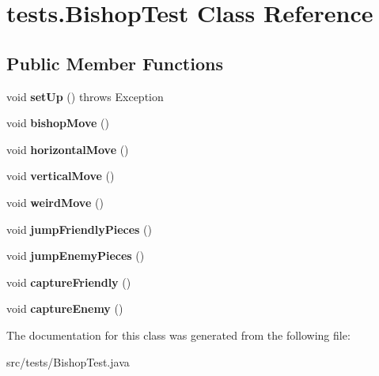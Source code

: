 \hypertarget{classtests_1_1_bishop_test}{\section{tests.\-Bishop\-Test Class Reference}
\label{classtests_1_1_bishop_test}
}
\subsection*{Public Member Functions}
\begin{DoxyCompactItemize}
\item 
\hypertarget{classtests_1_1_bishop_test_adeff634258715bf610ef1f657b0866f5}{void {\bfseries set\-Up} ()  throws Exception }\label{classtests_1_1_bishop_test_adeff634258715bf610ef1f657b0866f5}

\item 
\hypertarget{classtests_1_1_bishop_test_a628ea2649f6d7fdd7b6240a3a7de4597}{void {\bfseries bishop\-Move} ()}\label{classtests_1_1_bishop_test_a628ea2649f6d7fdd7b6240a3a7de4597}

\item 
\hypertarget{classtests_1_1_bishop_test_a4fe5bea5cde2887e3717600c654f2eab}{void {\bfseries horizontal\-Move} ()}\label{classtests_1_1_bishop_test_a4fe5bea5cde2887e3717600c654f2eab}

\item 
\hypertarget{classtests_1_1_bishop_test_a247b3d598a4d310bd23440ec1f63b1b0}{void {\bfseries vertical\-Move} ()}\label{classtests_1_1_bishop_test_a247b3d598a4d310bd23440ec1f63b1b0}

\item 
\hypertarget{classtests_1_1_bishop_test_aee47a6ff4e93a6454a431589b91a5e37}{void {\bfseries weird\-Move} ()}\label{classtests_1_1_bishop_test_aee47a6ff4e93a6454a431589b91a5e37}

\item 
\hypertarget{classtests_1_1_bishop_test_a8f7f82e6ee130181c90f57389c35a319}{void {\bfseries jump\-Friendly\-Pieces} ()}\label{classtests_1_1_bishop_test_a8f7f82e6ee130181c90f57389c35a319}

\item 
\hypertarget{classtests_1_1_bishop_test_ac98235f1eb576fdf224ed1b8469b088a}{void {\bfseries jump\-Enemy\-Pieces} ()}\label{classtests_1_1_bishop_test_ac98235f1eb576fdf224ed1b8469b088a}

\item 
\hypertarget{classtests_1_1_bishop_test_a6dbbfb5434f6826704e9e5b3cf443a6c}{void {\bfseries capture\-Friendly} ()}\label{classtests_1_1_bishop_test_a6dbbfb5434f6826704e9e5b3cf443a6c}

\item 
\hypertarget{classtests_1_1_bishop_test_a5378b093804f8755959dde2f98d82a64}{void {\bfseries capture\-Enemy} ()}\label{classtests_1_1_bishop_test_a5378b093804f8755959dde2f98d82a64}

\end{DoxyCompactItemize}


The documentation for this class was generated from the following file\-:\begin{DoxyCompactItemize}
\item 
src/tests/Bishop\-Test.\-java\end{DoxyCompactItemize}
